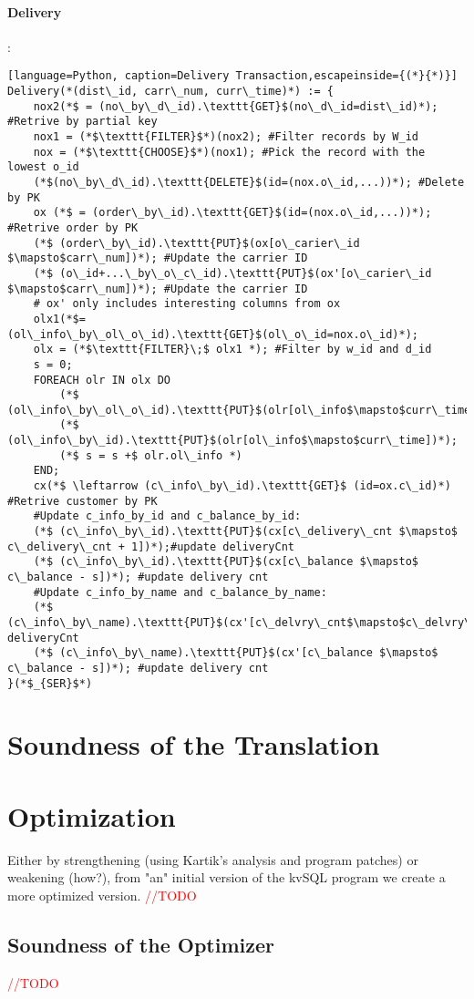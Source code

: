 \documentclass[12pt,letter]{article}
\begin{document}
\paragraph{Delivery}:
\begin{lstlisting}[language=Python, caption=Delivery Transaction,escapeinside={(*}{*)}]
Delivery(*(dist\_id, carr\_num, curr\_time)*) := {
	nox2(*$ = (no\_by\_d\_id).\texttt{GET}$(no\_d\_id=dist\_id)*); #Retrive by partial key
	nox1 = (*$\texttt{FILTER}$*)(nox2); #Filter records by W_id 
	nox = (*$\texttt{CHOOSE}$*)(nox1); #Pick the record with the lowest o_id
	(*$(no\_by\_d\_id).\texttt{DELETE}$(id=(nox.o\_id,...))*); #Delete by PK 
	ox (*$ = (order\_by\_id).\texttt{GET}$(id=(nox.o\_id,...))*); #Retrive order by PK
	(*$ (order\_by\_id).\texttt{PUT}$(ox[o\_carier\_id $\mapsto$carr\_num])*); #Update the carrier ID
	(*$ (o\_id+...\_by\_o\_c\_id).\texttt{PUT}$(ox'[o\_carier\_id $\mapsto$carr\_num])*); #Update the carrier ID
	# ox' only includes interesting columns from ox
	olx1(*$=(ol\_info\_by\_ol\_o\_id).\texttt{GET}$(ol\_o\_id=nox.o\_id)*);
	olx = (*$\texttt{FILTER}\;$ olx1 *); #Filter by w_id and d_id 
	s = 0;
	FOREACH olr IN olx DO
		(*$ (ol\_info\_by\_ol\_o\_id).\texttt{PUT}$(olr[ol\_info$\mapsto$curr\_time])*);
		(*$ (ol\_info\_by\_id).\texttt{PUT}$(olr[ol\_info$\mapsto$curr\_time])*);
		(*$ s = s +$ olr.ol\_info *)
	END;
	cx(*$ \leftarrow (c\_info\_by\_id).\texttt{GET}$ (id=ox.c\_id)*) #Retrive customer by PK
	#Update c_info_by_id and c_balance_by_id:
	(*$ (c\_info\_by\_id).\texttt{PUT}$(cx[c\_delivery\_cnt $\mapsto$ c\_delivery\_cnt + 1])*);#update deliveryCnt
	(*$ (c\_info\_by\_id).\texttt{PUT}$(cx[c\_balance $\mapsto$ c\_balance - s])*); #update delivery cnt
	#Update c_info_by_name and c_balance_by_name:
	(*$ (c\_info\_by\_name).\texttt{PUT}$(cx'[c\_delvry\_cnt$\mapsto$c\_delvry\_cnt+1])*);#update deliveryCnt
	(*$ (c\_info\_by\_name).\texttt{PUT}$(cx'[c\_balance $\mapsto$ c\_balance - s])*); #update delivery cnt
}(*$_{SER}$*)
\end{lstlisting}
\section{Soundness of the Translation}
\section{Optimization}
Either by strengthening (using Kartik's analysis and program patches) or weakening (how?), 
from "an" initial version of the kvSQL program we create a more optimized version.
\textcolor{red}{//TODO}
\subsection{Soundness of the Optimizer}
\textcolor{red}{//TODO}



































\end{document}
